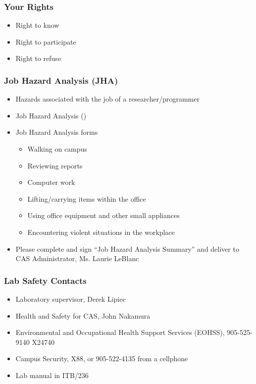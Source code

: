 \documentclass[handout]{beamer} %
\begin{document}

\begin{frame}
\frametitle{Your Rights}

\begin{itemize}
\item Right to know
\item Right to participate
\item Right to refuse
\end{itemize}

\end{frame}


\begin{frame}
\frametitle{Job Hazard Analysis (JHA)}

\begin{itemize}

\item Hazards associated with the job of a researcher/programmer
\item Job Hazard Analysis
()
\item Job Hazard Analysis forms
\begin{itemize}
\item Walking on campus
\item Reviewing reports
\item Computer work
\item Lifting/carrying items within the office
\item Using office equipment and other small appliances
\item Encountering violent situations in the workplace
\end{itemize}
\item Please complete and sign ``Job Hazard Analysis Summary'' and deliver to
  CAS Administrator, Ms. Laurie LeBlanc
\end{itemize}

\end{frame}


\begin{frame}
\frametitle{Lab Safety Contacts}

\begin{itemize}
\item Laboratory supervisor, Derek Lipiec
\item Health and Safety for CAS, John Nakamura
\item Environmental and Occupational Health Support Services (EOHSS), 905-525-9140 X24740
\item Campus Security, X88, or 905-522-4135 from a cellphone
\item Lab manual in ITB/236
\end{itemize}

\end{frame}
\end{document}
